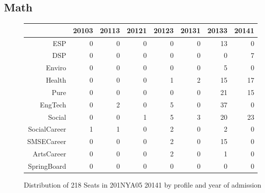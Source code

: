 \documentclass{article}\usepackage[]{graphicx}\usepackage[]{color}
\begin{document}
\subsection{Math}
\begin{figure}[H]
\centering
\begin{tabular}{rrrrrrrr}
  \hline
 & 20103 & 20113 & 20121 & 20123 & 20131 & 20133 & 20141 \\ 
  \hline
ESP &   0 &   0 &   0 &   0 &   0 &  13 &   0 \\ 
  DSP &   0 &   0 &   0 &   0 &   0 &   0 &   7 \\ 
  Enviro &   0 &   0 &   0 &   0 &   0 &   5 &   0 \\ 
  Health &   0 &   0 &   0 &   1 &   2 &  15 &  17 \\ 
  Pure &   0 &   0 &   0 &   0 &   0 &  21 &  15 \\ 
  EngTech &   0 &   2 &   0 &   5 &   0 &  37 &   0 \\ 
  Social &   0 &   0 &   1 &   5 &   3 &  20 &  23 \\ 
  SocialCareer &   1 &   1 &   0 &   2 &   0 &   2 &   0 \\ 
  SMSECareer &   0 &   0 &   0 &   2 &   0 &  15 &   0 \\ 
  ArtsCareer &   0 &   0 &   0 &   2 &   0 &   1 &   0 \\ 
  SpringBoard &   0 &   0 &   0 &   0 &   0 &   0 &   0 \\ 
   \hline
\end{tabular}
\caption{Distribution of 218 Seats in 201NYA05 20141 by profile and year of admission} 
\end{figure}
\end{document}
